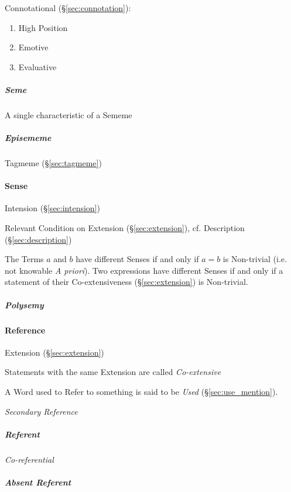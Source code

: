 Connotational (\S\ref{sec:connotation}):

\begin{enumerate}
  \item High Position
  \item Emotive
  \item Evaluative
\end{enumerate}



\subparagraph{Seme}\label{sec:seme}\hfill

A single characteristic of a Sememe



\subparagraph{Episememe}\label{sec:episememe}\hfill

Tagmeme (\S\ref{sec:tagmeme})



\paragraph{Sense}\label{sec:sense}\hfill
\cite{chalmers02}

Intension (\S\ref{sec:intension})

Relevant Condition on Extension (\S\ref{sec:extension}), cf.
Description (\S\ref{sec:description})

The Terms $a$ and $b$ have different Senses if and only if $a = b$ is
Non-trivial (i.e. not knowable \emph{A priori}). Two expressions have
different Senses if and only if a statement of their Co-extensiveness
(\S\ref{sec:extension}) is Non-trivial.

\subparagraph{Polysemy}\label{sec:polysemy}\hfill



\paragraph{Reference}\label{sec:reference}\hfill

Extension (\S\ref{sec:extension})

Statements with the same Extension are called \emph{Co-extensive}

A Word used to Refer to something is said to be \emph{Used}
(\S\ref{sec:use_mention}).

\emph{Secondary Reference}

\subparagraph{Referent}\label{sec:referent}\hfill

\emph{Co-referential}

\subparagraph{Absent Referent}\label{sec:absent_referent}\hfill

